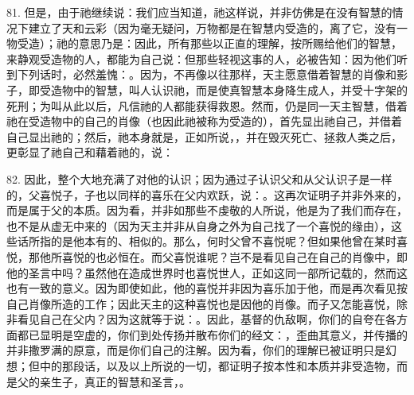 81. 但是，由于祂继续说：我们应当知道，祂这样说，并非仿佛是在没有智慧的情况下建立了天和云彩（因为毫无疑问，万物都是在智慧内受造的，离了它，没有一物受造）；祂的意思乃是：因此，所有那些以正直的理解，按所赐给他们的智慧，来静观受造物的人，都能为自己说：但那些轻视这事的人，必被告知：因为他们听到下列话时，必然羞愧：。因为，不再像以往那样，天主愿意借着智慧的肖像和影子，即受造物中的智慧，叫人认识祂，而是使真智慧本身降生成人，并受十字架的死刑；为叫从此以后，凡信祂的人都能获得救恩。然而，仍是同一天主智慧，借着祂在受造物中的自己的肖像（也因此祂被称为受造的），首先显出祂自己，并借着自己显出祂的；然后，祂本身就是，正如所说，，并在毁灭死亡、拯救人类之后，更彰显了祂自己和藉着祂的，说：\par

82. 因此，整个大地充满了对他的认识；因为通过子认识父和从父认识子是一样的，父喜悦子，子也以同样的喜乐在父内欢跃，说：。这再次证明子并非外来的，而是属于父的本质。因为看，并非如那些不虔敬的人所说，他是为了我们而存在，也不是从虚无中来的（因为天主并非从自身之外为自己找了一个喜悦的缘由），这些话所指的是他本有的、相似的。那么，何时父曾不喜悦呢？但如果他曾在某时喜悦，那他所喜悦的也必恒在。而父喜悦谁呢？岂不是看见自己在自己的肖像中，即他的圣言中吗？虽然他在造成世界时也喜悦世人，正如这同一部所记载的，然而这也有一致的意义。因为即使如此，他的喜悦并非因为喜乐加于他，而是再次看见按自己肖像所造的工作；因此天主的这种喜悦也是因他的肖像。而子又怎能喜悦，除非看见自己在父内？因为这就等于说：。因此，基督的仇敌啊，你们的自夸在各方面都已显明是空虚的，你们到处传扬并散布你们的经文：，歪曲其意义，并传播的并非撒罗满的原意，而是你们自己的注解。因为看，你们的理解已被证明只是幻想；但中的那段话，以及以上所说的一切，都证明子按本性和本质并非受造物，而是父的亲生子，真正的智慧和圣言，。\par

